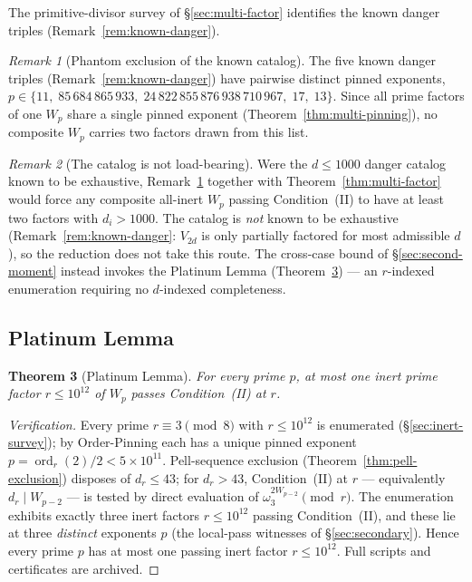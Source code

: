 \documentclass[11pt]{amsart}
\theoremstyle{plain}
\newtheorem{theorem}{Theorem}[section]
\theoremstyle{definition}
\theoremstyle{remark}
\newtheorem{remark}[theorem]{Remark}
\numberwithin{equation}{section}
\newcommand{\ord}{\operatorname{ord}}
\begin{document}
The primitive-divisor survey of \S\ref{sec:multi-factor} identifies the known danger triples (Remark~\ref{rem:known-danger}).

\begin{remark}[Phantom exclusion of the known catalog]\label{rem:phantom-exclusion}
The five known danger triples (Remark~\ref{rem:known-danger}) have pairwise distinct pinned exponents, $p \in \{11,\; 85\,684\,865\,933,\; 24\,822\,855\,876\,938\,710\,967,\; 17,\; 13\}$. Since all prime factors of one $W_p$ share a single pinned exponent (Theorem~\ref{thm:multi-pinning}), no composite $W_p$ carries two factors drawn from this list.
\end{remark}

\begin{remark}[The catalog is not load-bearing]\label{rem:catalog-not-loadbearing}
Were the $d \leq 1000$ danger catalog known to be exhaustive, Remark~\ref{rem:phantom-exclusion} together with Theorem~\ref{thm:multi-factor} would force any composite all-inert $W_p$ passing Condition~(II) to have at least two factors with $d_i > 1000$. The catalog is \emph{not} known to be exhaustive (Remark~\ref{rem:known-danger}: $V_{2d}$ is only partially factored for most admissible $d$), so the reduction does not take this route. The cross-case bound of \S\ref{sec:second-moment} instead invokes the Platinum Lemma (Theorem~\ref{thm:platinum}) --- an $r$-indexed enumeration requiring no $d$-indexed completeness.
\end{remark}

\subsection{Platinum Lemma}

\begin{theorem}[Platinum Lemma]\label{thm:platinum}
For every prime $p$, at most one inert prime factor $r \leq 10^{12}$ of $W_p$ passes Condition~(II) at $r$.
\end{theorem}

\begin{proof}[Verification]
Every prime $r \equiv 3 \pmod 8$ with $r \leq 10^{12}$ is enumerated (\S\ref{sec:inert-survey}); by Order-Pinning each has a unique pinned exponent $p = \ord_r(2)/2 < 5 \times 10^{11}$. Pell-sequence exclusion (Theorem~\ref{thm:pell-exclusion}) disposes of $d_r \leq 43$; for $d_r > 43$, Condition~(II) at $r$ --- equivalently $d_r \mid W_{p-2}$ --- is tested by direct evaluation of $\omega_3^{2 W_{p-2}} \pmod r$. The enumeration exhibits exactly three inert factors $r \leq 10^{12}$ passing Condition~(II), and these lie at three \emph{distinct} exponents $p$ (the local-pass witnesses of \S\ref{sec:secondary}). Hence every prime $p$ has at most one passing inert factor $r \leq 10^{12}$. Full scripts and certificates are archived.
\end{proof}
\end{document}
